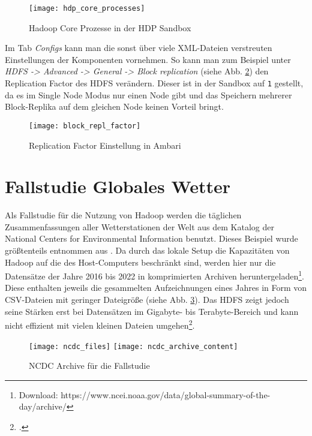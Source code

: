 \begin{figure}[ht]
    \centering
    \texttt{[image: hdp\_core\_processes]}
    \caption[Hadoop Core Prozesse in der HDP Sandbox]{Hadoop Core Prozesse in der HDP Sandbox}
    \label{fig:hdp core processes}
\end{figure}

Im Tab \textit{Configs} kann man die sonst über viele XML-Dateien verstreuten Einstellungen der Komponenten vornehmen. So kann man zum Beispiel unter \textit{HDFS -> Advanced -> General -> Block replication} (siehe Abb. \ref{fig:block replication factor}) den Replication Factor des HDFS verändern. Dieser ist in der Sandbox auf \verb|1| gestellt, da es im Single Node Modus nur einen Node gibt und das Speichern mehrerer Block-Replika auf dem gleichen Node keinen Vorteil bringt.  

\begin{figure}[ht]
    \centering
    \texttt{[image: block\_repl\_factor]}
    \caption[Replication Factor Einstellung in Ambari]{Replication Factor Einstellung in Ambari}
    \label{fig:block replication factor}
\end{figure}


\section{Fallstudie Globales Wetter}
Als Fallstudie für die Nutzung von Hadoop werden die täglichen Zusammenfassungen aller Wetterstationen der Welt aus dem Katalog der National Centers for Environmental Information\cite{docnoaanesdisncdc_global_2022} benutzt. Dieses Beispiel wurde größtenteils entnommen aus . Da durch das lokale Setup die Kapazitäten von Hadoop auf die des Host-Computers beschränkt sind, werden hier nur die Datensätze der Jahre 2016 bis 2022 in komprimierten Archiven heruntergeladen\footnote{Download: https://www.ncei.noaa.gov/data/global-summary-of-the-day/archive/}. Diese enthalten jeweils die gesammelten Aufzeichnungen eines Jahres in Form von CSV-Dateien mit geringer Dateigröße (siehe Abb. \ref{fig:ncdc files local}). Das HDFS zeigt jedoch seine Stärken erst bei Datensätzen im Gigabyte- bis Terabyte-Bereich und kann nicht effizient mit vielen kleinen Dateien umgehen\footcite[vgl.][Assumptions and Goals -> Large Data Sets]{noauthor_apache_nodate-1}. 

\begin{figure}[ht]
    \centering
    \texttt{[image: ncdc\_files]}
    \texttt{[image: ncdc\_archive\_content]}
    \caption[NCDC Archive für die Fallstudie]{NCDC Archive für die Fallstudie}
    \label{fig:ncdc files local}
\end{figure}

